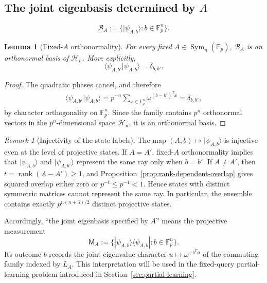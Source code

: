 \documentclass[11pt]{article}
\newcommand{\F}{\mathbb F}
\newcommand{\Sym}{\operatorname{Sym}}
\newcommand{\rank}{\operatorname{rank}}
\newcommand{\1}{\mathbf 1}
\theoremstyle{plain}
\newtheorem{lemma}[theorem]{Lemma}
\theoremstyle{definition}
\theoremstyle{remark}
\newtheorem{remark}[theorem]{Remark}
\begin{document}
\subsection{The joint eigenbasis determined by \texorpdfstring{$A$}{A}}
\label{subsec:odd-measurement-basis}
\begin{equation}
  \mathcal B_A
  :=\{|\psi_{A,b}\rangle:b\in\F_p^n\}.
  \label{eq:basis-BA-definition}
\end{equation}

\begin{lemma}[Fixed-$A$ orthonormality]
\label{lem:fixed-A-orthonormality}
For every fixed $A\in\Sym_n(\F_p)$, $\mathcal B_A$ is an orthonormal basis of
$\mathcal H_n$.  More explicitly,
\begin{equation}
  \langle\psi_{A,b'}|\psi_{A,b}\rangle=\delta_{b,b'}.
  \label{eq:fixed-A-orthonormality}
\end{equation}
\end{lemma}

\begin{proof}
The quadratic phases cancel, and therefore
\begin{align}
  \langle\psi_{A,b'}|\psi_{A,b}\rangle
  =p^{-n}\sum_{x\in\F_p^n}\omega^{(b-b')^Tx}
  =\delta_{b,b'},
  \label{eq:character-orthogonality}
\end{align}
by character orthogonality on $\F_p^n$.  Since the family contains $p^n$
orthonormal vectors in the $p^n$-dimensional space $\mathcal H_n$, it is an
orthonormal basis.
\end{proof}

\begin{remark}[Injectivity of the state labels]
\label{rem:odd-state-label-injectivity}
The map $(A,b)\mapsto|\psi_{A,b}\rangle$ is injective even at the level of
projective states.  If $A=A'$, fixed-$A$ orthonormality implies that
$|\psi_{A,b}\rangle$ and $|\psi_{A,b'}\rangle$ represent the same ray only when
$b=b'$.  If $A\ne A'$, then $t=\rank(A-A')\ge1$, and
Proposition~\ref{prop:rank-dependent-overlap} gives squared overlap either zero
or $p^{-t}\le p^{-1}<1$.  Hence states with distinct symmetric matrices cannot represent
the same ray.  In particular, the ensemble contains exactly $p^{n(n+3)/2}$ distinct
projective states.
\end{remark}

Accordingly, ``the joint eigenbasis specified by $A$'' means the projective
measurement
\begin{equation}
  \mathsf M_A
  :=\{|\psi_{A,b}\rangle\langle\psi_{A,b}|:b\in\F_p^n\}.
  \label{eq:joint-eigenbasis-measurement}
\end{equation}
Its outcome $b$ records the joint eigenvalue character
$u\mapsto\omega^{-b^Tu}$ of the commuting family indexed by $L_A$.
This interpretation will be used in the fixed-query partial-learning problem
introduced in Section~\ref{sec:partial-learning}.
\end{document}
